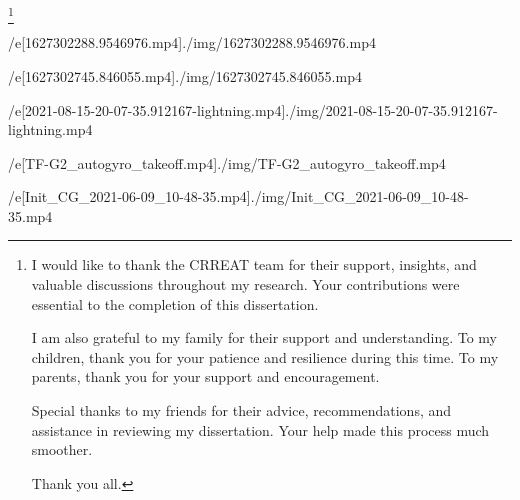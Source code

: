 

\thanks{
I would like to thank the CRREAT team for their support, insights, and valuable discussions throughout my research. Your contributions were essential to the completion of this dissertation.

I am also grateful to my family for their support and understanding. To my children, thank you for your patience and resilience during this time. To my parents, thank you for your support and encouragement.

Special thanks to my friends for their advice, recommendations, and assistance in reviewing my dissertation. Your help made this process much smoother.

Thank you all.
}

\def\mycite[#1]{{\null\def\_addcitelist##1{}\nonumcitations\unskip\cite[#1]}}
\def\specialbibs{\bibnum=1000
   \def\_printbib{\hangindent=2\iindent
      \noindent\hskip2\iindent \llap{[\the\bibmark] }}%
}


\def\printcaption#1#2{\leftskip=\iindent \rightskip=\iindent 
   \setbox0=\hbox\bgroup \aftergroup\docaption{\bf#1 #2.}\enspace} 
\def\docaption{\tmpdim=\hsize \advance\tmpdim by-2\iindent 
   \ifdim\wd0>\tmpdim \unhbox0 \else \hfil\hfil\unhbox0 \fi \endgraf \egroup} 




\filedef/e[1627302288.9546976.mp4]{./img/1627302288.9546976.mp4}
\attach[1627302288.9546976.mp4]

\filedef/e[1627302745.846055.mp4]{./img/1627302745.846055.mp4}
\attach[1627302745.846055.mp4]

\filedef/e[2021-08-15-20-07-35.912167-lightning.mp4]{./img/2021-08-15-20-07-35.912167-lightning.mp4}
\attach[2021-08-15-20-07-35.912167-lightning.mp4]

\filedef/e[TF-G2_autogyro_takeoff.mp4]{./img/TF-G2_autogyro_takeoff.mp4}

\filedef/e[Init_CG_2021-06-09_10-48-35.mp4]{./img/Init_CG_2021-06-09_10-48-35.mp4}
\attach[Init_CG_2021-06-09_10-48-35.mp4]



